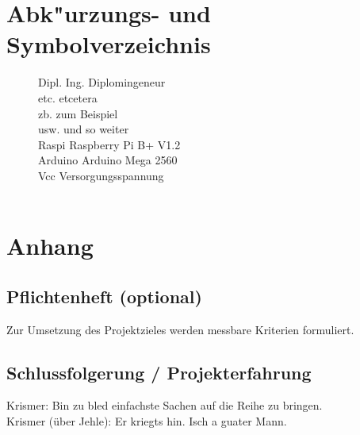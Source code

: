 \documentclass[12pt,a4paper]{article}
\newcommand{\yhbu}[0]{\color{ydkbu}}	%
\newcommand{\korr}[0]{\color{corrclr}\fontsize{8pt}{9pt}\selectfont\bf} %
\newcommand\tbs{\textbackslash}		%
\begin{document}
\section{Abk"urzungs- und Symbolverzeichnis}
\begin{figure}[h!]
Dipl. Ing. \dotfill Diplomingeneur \\
etc. \dotfill etcetera\\
zb. \dotfill zum Beispiel\\
usw. \dotfill und so weiter\\
Raspi \dotfill Raspberry Pi B+ V1.2\\
Arduino \dotfill Arduino Mega 2560\\
Vcc \dotfill Versorgungsspannung\\
\dotfill\\
\end{figure}
%
%
%
\renewcommand{\thesection}{\arabic{section}}
\newpage
\section{Anhang}
\appendix
\renewcommand{\thesection}{\Alph{section}}
\setcounter{section}{1}
\setcounter{subsection}{0}
 \subsection{Pflichtenheft (optional)}
	{\yhbu Zur Umsetzung des Projektzieles werden messbare Kriterien formuliert.}
 \subsection{Schlussfolgerung / Projekterfahrung}
	Krismer: Bin zu bled einfachste Sachen auf die Reihe zu bringen. \\
	Krismer (über Jehle): Er kriegts hin. Isch a guater Mann. \\
\end{document}
